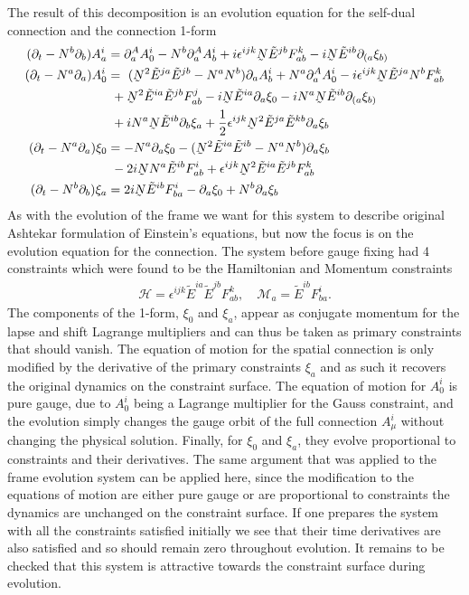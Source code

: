 \documentclass[10pt]{report}
\newcommand{\utilde}[1]{\underaccent{\tilde}{#1}}
\theoremstyle{definition}
\newcommand{\tE}[0]{\tilde{E}}
\newcommand{\dlap}[0]{\utilde{N}}
\begin{document}
    The result of this decomposition is an evolution equation for the self-dual connection and the connection 1-form
    \begin{equation}
    \begin{aligned}
        (\partial_t - N^b \partial_b) A^i_a & = \partial^A_a A^i_0 - N^b \partial^A_a A^i_b + i \epsilon^{ijk} \dlap \tE^{jb} F^k_{ab} - i \dlap \tE^{ib} \partial_{(a} \xi_{b)} \\
        (\partial_t - N^a \partial_a) A^i_0 & = \ (\dlap^2 \tE^{ja} \tE^{jb} - N^a N^b) \partial_a A^i_b + N^a \partial^A_a A^i_0 - i \epsilon^{ijk} \dlap \tE^{ja} N^b F^k_{ab} \\ &\ + \dlap^2 \tE^{ia} \tE^{jb} F^j_{ab} - i \dlap \tE^{ia} \partial_a \xi_0 - i N^a \dlap \tE^{ib} \partial_{(a} \xi_{b)} \\ &\  + i N^a \dlap \tE^{ib} \partial_b \xi_a + \frac{1}{2} \epsilon^{ijk} \dlap^2 \tE^{ja} \tE^{kb} \partial_a \xi_b \\
        (\partial_t - N^a \partial_a)\xi_0 & = - N^a \partial_a \xi_0 - (\dlap^2 \tE^{ia} \tE^{ib} - N^a N^b) \partial_a \xi_b \\ &\  -2i \dlap N^a \tE^{ib} F^i_{ab} + \epsilon^{ijk} \dlap^2 \tE^{ia} \tE^{jb} F^k_{ab} \\
        (\partial_t - N^b \partial_b)\xi_a & = 2i \dlap \tE^{ib} F^i_{ba} - \partial_a \xi_0 + N^b \partial_a \xi_b
    \end{aligned}
    \end{equation}
    As with the evolution of the frame we want for this system to describe original Ashtekar formulation of Einstein's equations, but now the focus is on the evolution equation for the connection. The system before gauge fixing had 4 constraints which were found to be the Hamiltonian and Momentum constraints
        \begin{align}
        \mathcal{H} = \epsilon^{ijk} \tE^{ia} \tE^{jb} F^k_{ab}, \quad \mathcal{M}_a = \tE^{ib} F^i_{ba}.
    \end{align}
    The components of the 1-form, $\xi_0$ and $\xi_a$, appear as conjugate momentum for the lapse and shift Lagrange multipliers and can thus be taken as primary constraints that should vanish. The equation of motion for the spatial connection is only modified by the derivative of the primary constraints $\xi_a$ and as such it recovers the original dynamics on the constraint surface. The equation of motion for $A^i_0$ is pure gauge, due to $A^i_0$ being a Lagrange multiplier for the Gauss constraint, and the evolution simply changes the gauge orbit of the full connection $A^i_\mu$ without changing the physical solution. Finally, for $\xi_0$ and $\xi_a$, they evolve proportional to constraints and their derivatives. The same argument that was applied to the frame evolution system can be applied here, since the modification to the equations of motion are either pure gauge or are proportional to constraints the dynamics are unchanged on the constraint surface. If one prepares the system with all the constraints satisfied initially we see that their time derivatives are also satisfied and so should remain zero throughout evolution. It remains to be checked that this system is attractive towards the constraint surface during evolution.
\end{document}
